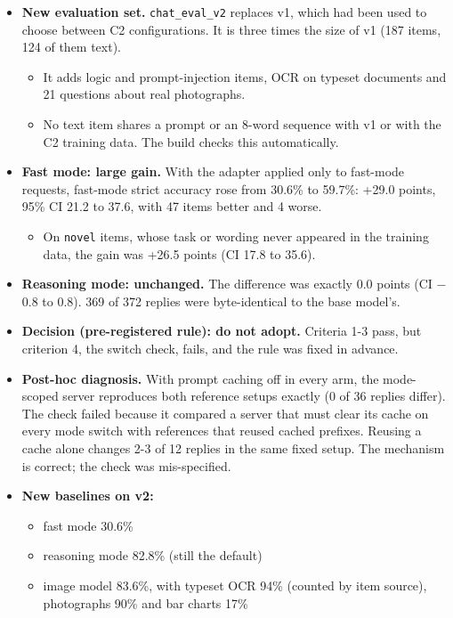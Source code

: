 \documentclass[11pt,a4paper]{article}
\newcommand{\code}[1]{\texttt{#1}}
\begin{document}
\begin{itemize}
\item \textbf{New evaluation set.} \code{chat\_eval\_v2} replaces v1, which had been used to choose between C2 configurations. It is three times the size of v1 (187 items, 124 of them text).
\begin{itemize}
\item It adds logic and prompt-injection items, OCR on typeset documents and 21 questions about real photographs.
\item No text item shares a prompt or an 8-word sequence with v1 or with the C2 training data. The build checks this automatically.
\end{itemize}
\item \textbf{Fast mode: large gain.} With the adapter applied only to fast-mode requests, fast-mode strict accuracy rose from 30.6\% to 59.7\%: +29.0 points, 95\% CI 21.2 to 37.6, with 47 items better and 4 worse.
\begin{itemize}
\item On \code{novel} items, whose task or wording never appeared in the training data, the gain was +26.5 points (CI 17.8 to 35.6).
\end{itemize}
\item \textbf{Reasoning mode: unchanged.} The difference was exactly 0.0 points (CI $-$0.8 to 0.8). 369 of 372 replies were byte-identical to the base model's.
\item \textbf{Decision (pre-registered rule): do not adopt.} Criteria 1-3 pass, but criterion 4, the switch check, fails, and the rule was fixed in advance.
\item \textbf{Post-hoc diagnosis.} With prompt caching off in every arm, the mode-scoped server reproduces both reference setups exactly (0 of 36 replies differ). The check failed because it compared a server that must clear its cache on every mode switch with references that reused cached prefixes. Reusing a cache alone changes 2-3 of 12 replies in the same fixed setup. The mechanism is correct; the check was mis-specified.
\item \textbf{New baselines on v2:}
\begin{itemize}
\item fast mode 30.6\%
\item reasoning mode 82.8\% (still the default)
\item image model 83.6\%, with typeset OCR 94\% (counted by item source), photographs 90\% and bar charts 17\%
\end{itemize}
\end{itemize}
\end{document}
